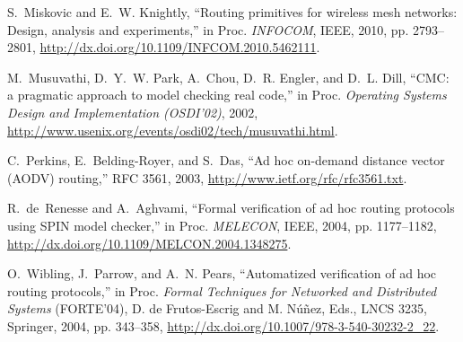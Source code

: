 \documentclass[conference,twoside]{IEEEtran}
\begin{document}
\begin{thebibliography}{10}
S.~Miskovic and E.~W. Knightly, ``Routing primitives for wireless mesh
  networks: Design, analysis and experiments,'' in
  Proc. \emph{INFOCOM}, IEEE, 2010,
  pp. 2793--2801, \url{http://dx.doi.org/10.1109/INFCOM.2010.5462111}.

M.~Musuvathi, D.~Y.~W. Park, A.~Chou, D.~R. Engler, and D.~L. Dill, ``{CMC:} a
  pragmatic approach to model checking real code,'' in Proc. \emph{Operating Systems
  Design and Implementation (OSDI'02)}, 2002,
  \url{http://www.usenix.org/events/osdi02/tech/musuvathi.html}.

C.~Perkins, E.~Belding-Royer, and S.~Das, ``Ad hoc on-demand distance vector
  {(AODV)} routing,'' RFC 3561, 2003,
  \url{http://www.ietf.org/rfc/rfc3561.txt}.

R.~de~Renesse and A.~Aghvami, ``Formal verification of ad hoc routing protocols
  using {SPIN} model checker,'' in Proc. \emph{MELECON},
  IEEE, 2004, pp. 1177--1182,
  \url{http://dx.doi.org/10.1109/MELCON.2004.1348275}.

O.~Wibling, J.~Parrow, and A.~N. Pears, ``Automatized verification of ad hoc
  routing protocols,'' in Proc. \emph{Formal Techniques for Networked and Distributed
  Systems} (FORTE'04), D. de Frutos-Escrig and M. N\'u\~nez, Eds., LNCS 3235, Springer, 2004, pp. 343--358,
  \url{http://dx.doi.org/10.1007/978-3-540-30232-2\_22}.

\end{thebibliography}
\end{document}
